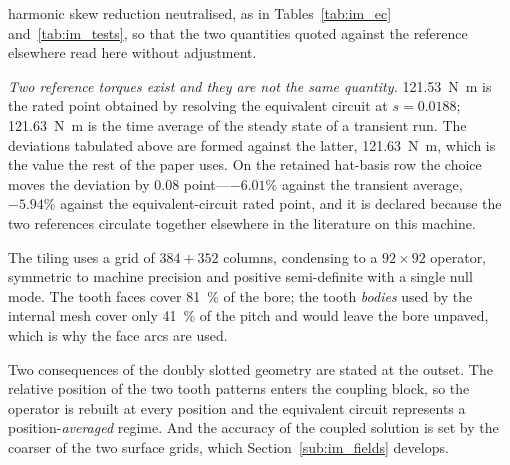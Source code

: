 \documentclass[10pt,a4paper,twocolumn]{article}
\theoremstyle{plain}
\theoremstyle{remark}
\begin{document}
\begin{table}[!t]
\begin{threeparttable}
\begin{tablenotes}[flushleft]
harmonic skew reduction neutralised, as in Tables~\ref{tab:im_ec}
and~\ref{tab:im_tests}, so that the two quantities quoted against the
reference elsewhere read here without adjustment.
\item[a] \emph{Two reference torques exist and they are not the same
quantity.} \SI{121.53}{\newton\metre} is the rated point obtained by
resolving the equivalent circuit at $s=\num{0.0188}$;
\SI{121.63}{\newton\metre} is the time average of the steady state of a
transient run. The deviations tabulated above are formed against the
latter, \SI{121.63}{\newton\metre}, which is the value the rest of the
paper uses. On the retained hat-basis row the choice moves the deviation
by \num{0.08} point---$-6.01\%$ against the transient average,
$-5.94\%$ against the equivalent-circuit rated point, and it is
declared because the two references circulate together elsewhere in the
literature on this machine.
\end{tablenotes}
\end{threeparttable}
\caption{The price of a well-posed closure: three air-gap models against
the finite-element reference, \SI{18.5}{\kilo\watt} machine, rated point
$s=\num{0.0188}$.}
\label{tab:price}
\end{table}

The tiling uses a grid of $384+352$ columns, condensing to a
$92\times92$ operator, symmetric to machine precision and positive
semi-definite with a single null mode. The tooth faces cover
\SI{81}{\percent} of the bore; the tooth \emph{bodies} used by the
internal mesh cover only \SI{41}{\percent} of the pitch and would leave
the bore unpaved, which is why the face arcs are used.

Two consequences of the doubly slotted geometry are stated at the
outset. The relative position of the two tooth patterns enters the
coupling block, so the operator is rebuilt at every position and the
equivalent circuit represents a position-\emph{averaged} regime. And the
accuracy of the coupled solution is set by the coarser of the two
surface grids, which Section~\ref{sub:im_fields} develops.
\end{document}

